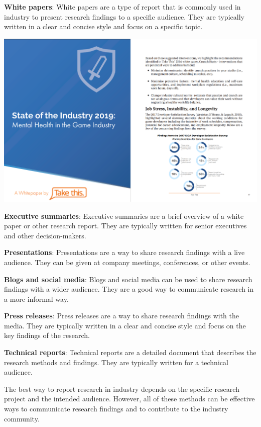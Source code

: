 \documentclass[
  b5paper]{book}
\begin{document}
\textbf{White papers}: White papers are a type of report that is commonly used in industry to present research findings to a specific audience. They are typically written in a clear and concise style and focus on a specific topic.

\includegraphics[width=1\textwidth,height=\textheight]{images/white_paper.png}

\textbf{Executive summaries}: Executive summaries are a brief overview of a white paper or other research report. They are typically written for senior executives and other decision-makers.

\textbf{Presentations}: Presentations are a way to share research findings with a live audience. They can be given at company meetings, conferences, or other events.

\textbf{Blogs and social media}: Blogs and social media can be used to share research findings with a wider audience. They are a good way to communicate research in a more informal way.

\textbf{Press releases}: Press releases are a way to share research findings with the media. They are typically written in a clear and concise style and focus on the key findings of the research.

\textbf{Technical reports}: Technical reports are a detailed document that describes the research methods and findings. They are typically written for a technical audience.

The best way to report research in industry depends on the specific research project and the intended audience. However, all of these methods can be effective ways to communicate research findings and to contribute to the industry community.
\end{document}
